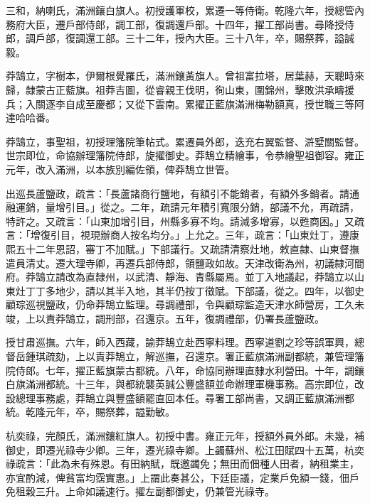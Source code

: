 \begin{pinyinscope}
三和，納喇氏，滿洲鑲白旗人。初授護軍校，累遷一等侍衛。乾隆六年，授總管內務府大臣，遷戶部侍郎，調工部，復調還戶部。十四年，擢工部尚書。尋降授侍郎，調戶部，復調還工部。三十二年，授內大臣。三十八年，卒，賜祭葬，謚誠毅。

莽鵠立，字樹本，伊爾根覺羅氏，滿洲鑲黃旗人。曾祖富拉塔，居葉赫，天聰時來歸，隸蒙古正藍旗。祖莽吉圖，從睿親王伐明，徇山東，圍錦州，擊敗洪承疇援兵；入關逐李自成至慶都；又從下雲南。累擢正藍旗滿洲梅勒額真，授世職三等阿達哈哈番。

莽鵠立，事聖祖，初授理籓院筆帖式。累遷員外郎，迭充右翼監督、滸墅關監督。世宗即位，命協辦理籓院侍郎，旋擢御史。莽鵠立精繪事，令恭繪聖祖御容。雍正元年，改入滿洲，以本族別編佐領，俾莽鵠立世管。

出巡長蘆鹽政，疏言：「長蘆諸商行鹽地，有額引不能銷者，有額外多銷者。請通融運銷，量增引目。」從之。二年，疏請元年積引寬限分銷，部議不允，再疏請，特許之。又疏言：「山東加增引目，州縣多寡不均。請減多增寡，以甦商困。」又疏言：「增復引目，視現辦商人按名均分。」上允之。三年，疏言：「山東灶丁，遵康熙五十二年恩詔，審丁不加賦。」下部議行。又疏請清察灶地，敕直隸、山東督撫遣員清丈。遷大理寺卿，再遷兵部侍郎，領鹽政如故。天津改衛為州，初議隸河間府。莽鵠立請改為直隸州，以武清、靜海、青縣屬焉。並丁入地議起，莽鵠立以山東灶丁丁多地少，請以其半入地，其半仍按丁徵賦。下部議，從之。四年，以御史顧琮巡視鹽政，仍命莽鵠立監理。尋調禮部，令與顧琮監造天津水師營房，工久未竣，上以責莽鵠立，調刑部，召還京。五年，復調禮部，仍署長蘆鹽政。

授甘肅巡撫。六年，師入西藏，諭莽鵠立赴西寧料理。西寧道劉之珍等誤軍興，總督岳鍾琪疏劾，上以責莽鵠立，解巡撫，召還京。署正藍旗滿洲副都統，兼管理籓院侍郎。七年，擢正藍旗蒙古都統。八年，命協同辦理直隸水利營田。十年，調鑲白旗滿洲都統。十三年，與都統襲英誠公豐盛額並命辦理軍機事務。高宗即位，改設總理事務處，莽鵠立與豐盛額罷直回本任。尋署工部尚書，又調正藍旗滿洲都統。乾隆元年，卒，賜祭葬，謚勤敏。

杭奕祿，完顏氏，滿洲鑲紅旗人。初授中書。雍正元年，授額外員外郎。未幾，補御史，即遷光祿寺少卿。三年，遷光祿寺卿。上蠲蘇州、松江田賦四十五萬，杭奕祿疏言：「此為未有殊恩。有田納賦，既邀蠲免；無田而佃種人田者，納租業主，亦宜酌減，俾貧富均霑實惠。」上謂此奏甚公，下廷臣議，定業戶免額一錢，佃戶免租穀三升。上命如議速行。擢左副都御史，仍兼管光祿寺。


\end{pinyinscope}
